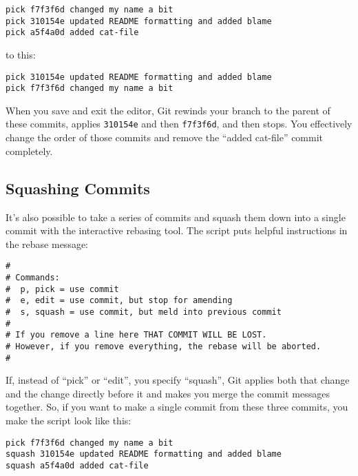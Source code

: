 \documentclass[a4paper]{book}
\begin{document}
\begin{shaded}\begin{verbatim}
pick f7f3f6d changed my name a bit
pick 310154e updated README formatting and added blame
pick a5f4a0d added cat-file
\end{verbatim}\end{shaded}

to this:

\begin{shaded}\begin{verbatim}
pick 310154e updated README formatting and added blame
pick f7f3f6d changed my name a bit
\end{verbatim}\end{shaded}

When you save and exit the editor, Git rewinds your branch to the parent of these commits, applies \texttt{310154e} and then \texttt{f7f3f6d}, and then stops. You effectively change the order of those commits and remove the “added cat-file” commit completely.

\subsection{Squashing Commits}\label{squashing-commits}

It's also possible to take a series of commits and squash them down into a single commit with the interactive rebasing tool. The script puts helpful instructions in the rebase message:

\begin{shaded}\begin{verbatim}
#
# Commands:
#  p, pick = use commit
#  e, edit = use commit, but stop for amending
#  s, squash = use commit, but meld into previous commit
#
# If you remove a line here THAT COMMIT WILL BE LOST.
# However, if you remove everything, the rebase will be aborted.
#
\end{verbatim}\end{shaded}

If, instead of “pick” or “edit”, you specify “squash”, Git applies both that change and the change directly before it and makes you merge the commit messages together. So, if you want to make a single commit from these three commits, you make the script look like this:

\begin{shaded}\begin{verbatim}
pick f7f3f6d changed my name a bit
squash 310154e updated README formatting and added blame
squash a5f4a0d added cat-file
\end{verbatim}\end{shaded}
\end{document}
